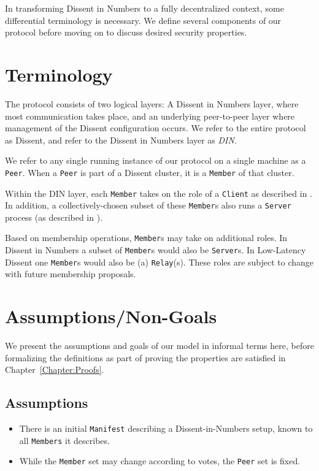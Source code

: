 In transforming Dissent in Numbers\cite{wolinsky_dissent_2012} to a fully
decentralized context, some differential terminology is necessary. We define
several components of our protocol before moving on to discuss desired security
properties.

\section{Terminology}
The protocol consists of two logical layers: A Dissent in Numbers layer, where
most communication takes place, and an underlying peer-to-peer layer where
management of the Dissent configuration occurs. We refer to the entire protocol
as Dissent, and refer to the Dissent in Numbers layer as \textit{DIN}.

We refer to any single running instance of our protocol on a single machine as a
\texttt{Peer}. When a \texttt{Peer} is part of a Dissent cluster, it is a
\texttt{Member} of that cluster.

Within the DIN layer, each \texttt{Member} takes on the role of a
\texttt{Client} as described in \cite{wolinsky_dissent_2012}. In addition, a
collectively-chosen subset of these \texttt{Member}s also runs a \texttt{Server}
process (as described in \cite{wolinsky_dissent_2012}).

Based on membership operations, \texttt{Member}s may take on additional roles.
In Dissent in Numbers a subset of \texttt{Member}s would also be
\texttt{Server}s. In Low-Latency Dissent one \texttt{Member}s would
also be (a) \texttt{Relay}(s). These roles are subject to change with future
membership proposals.

\section{Assumptions/Non-Goals}
We present the assumptions and goals of our model in informal terms here,
before formalizing the definitions as part of proving the properties are
satisfied in Chapter~\ref{Chapter:Proofs}.
\subsection{Assumptions}
\begin{itemize}
  \item There is an initial \texttt{Manifest} describing a Dissent-in-Numbers
    setup, known to all \texttt{Members} it describes.
  \item While the \texttt{Member} set may change according to votes, the
    \texttt{Peer} set is fixed.
\end{itemize}
